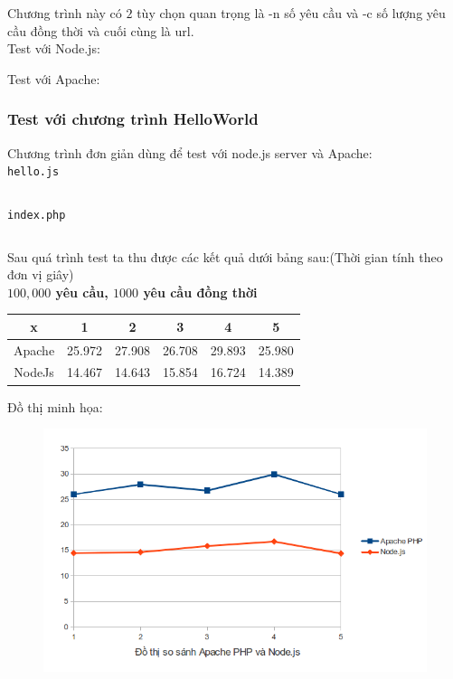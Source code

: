 	Chương trình này có $2$ tùy chọn quan trọng là -n số yêu cầu và -c số lượng yêu cầu đồng thời và cuối cùng là url.\\
Test với Node.js: \\
	\begin{center}
	\end{center}

Test với Apache:
	\begin{center}
	\end{center}


\subsubsection*{Test với chương trình HelloWorld}
Chương trình đơn giản dùng để test với node.js server và Apache:\\
\texttt{hello.js}
	\begin{framed}
		\inputminted[tabsize=4,linenos=true]{javascript}{hello.js}
	\end{framed}

\texttt{index.php}
	\begin{framed}
		\inputminted[tabsize=4,linenos=true]{php}{index.php}
	\end{framed}

Sau quá trình test ta thu được các kết quả dưới bảng sau:(Thời gian tính theo đơn vị giây)\\
\textbf{$100,000$ yêu cầu, $1000$ yêu cầu đồng thời} \\
	\begin{tabular}{|c|c|c|c|c|c|}
		\hline
		x & 1 & 2 & 3 & 4 & 5 \\
		\hline
		Apache & 25.972 & 27.908 & 26.708 & 29.893 & 25.980 \\
		\hline
		NodeJs & 14.467 & 14.643 & 15.854 & 16.724 & 14.389
		\\ \hline
	\end{tabular}
\newpage

Đồ thị minh họa:\\
	\begin{figure}[-h]
		\centering
		\includegraphics[scale=0.6]{1_1.png}
	\end{figure}

